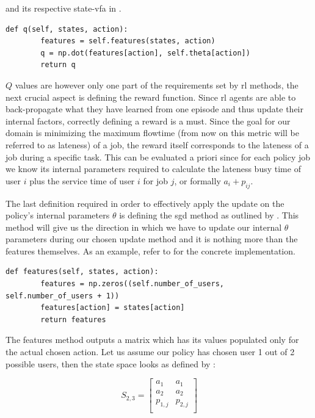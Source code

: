 \documentclass{seal_thesis}
\begin{document}
and its respective state-\gls{vfa} in .

\begin{lstlisting}[caption=State-\gls{vfa},label=lst:value_f_approx,style=CustomPython]
    def q(self, states, action):
        features = self.features(states, action)
        q = np.dot(features[action], self.theta[action])
        return q
\end{lstlisting}
 
 $Q$ values are however only one part of the requirements set by \gls{rl} methods, the next crucial aspect is defining the reward function. Since \gls{rl} agents are able to back-propagate what they have learned from one episode and thus update their internal factors, correctly defining a reward is a must. Since the goal for our domain is minimizing the maximum flowtime (from now on this metric will be referred to as lateness) of a job, the reward itself corresponds to the lateness of a job during a specific task. This can be evaluated a priori since for each policy job we know its internal parameters required to calculate the lateness \ie busy time of user $i$ plus the service time of user $i$ for job $j$, or formally $a_i+p_{ij}$.

 The last definition required in order to effectively apply the update on the policy's internal parameters $\theta$ is defining the \gls{sgd} method as outlined by . This method will give us the direction in which we have to update our internal $\theta$ parameters during our chosen update method and it is nothing more than the features themselves. As an example, refer to  for the concrete implementation.

 \begin{lstlisting}[caption=Features definition,label=lst:features_definition,style=CustomPython]
    def features(self, states, action):
        features = np.zeros((self.number_of_users, self.number_of_users + 1))
        features[action] = states[action]
        return features
\end{lstlisting}

The features method outputs a matrix which has its values populated only for the actual chosen action. Let us assume our policy has chosen user 1 out of 2 possible users, then the state space looks as defined by :

\begin{equation}
\label{eq:kbatch_sp_ex}
	S_{2,3} = 
	\begin{bmatrix}
	a_1 & a_1 \\
	a_2 & a_2 \\
	p_{1,j} & p_{2,j} \\
	\end{bmatrix}
\end{equation}
\end{document}
